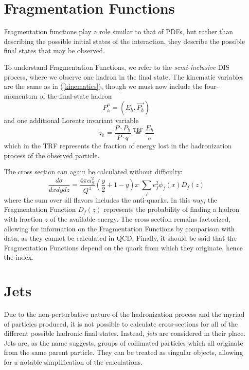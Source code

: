 \documentclass[10pt,a4paper]{book}
\begin{document}
\section{Fragmentation Functions}
Fragmentation functions play a role similar to that of PDFs, but rather than describing the possible initial states of the interaction, they describe the possible final states that may be observed.

To understand Fragmentation Functions, we refer to the \emph{semi-inclusive} DIS process, where we observe one hadron in the final state. The kinematic variables are the same as in (\ref{kinematics}), though we must now include the four-momentum of the final-state hadron
\begin{equation}
P_h^\mu = (E_h, \vec{P_h})
\end{equation} 
and one additional Lorentz invariant variable
\begin{equation}
z_h = \frac{P \cdot P_h}{P \cdot q} \overset{\mathrm{TRF}}{=} \frac{E_h}{\nu}
\end{equation}
which in the TRF represents the fraction of energy lost in the hadronization process of the observed particle. 

The cross section can again be calculated without difficulty:
\begin{equation}
\frac{d\sigma}{dx dy dz} = \frac{4\pi\alpha^2_S}{Q^4}\left(\frac{y}{2} + 1 - y\right)x \; \sum_f e_f^2 \phi_f(x) D_f(z)
\label{cross section FF}
\end{equation}
where the sum over all flavors includes the anti-quarks. In this way, the Fragmentation Function $D_f(z)$ represents the probability of finding a hadron with fraction $z$ of the available energy. The cross section remains factorized, allowing for information on the Fragmentation Functions by comparison with data, as they cannot be calculated in QCD. Finally, it should be said that the Fragmentation Functions depend on the quark from which they originate, hence the index. 

\section{Jets}
Due to the non-perturbative nature of the hadronization process and the myriad of particles produced, it is not possible to calculate cross-sections for all of the different possible hadronic final states. Instead, \emph{jets} are considered in their place. Jets are, as the name suggests, groups of collimated particles which all originate from the same parent particle. They can be treated as singular objects, allowing for a notable simplification of the calculations. 
\end{document}
